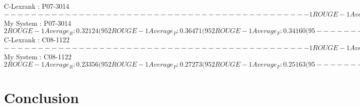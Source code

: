 \documentclass[hyp]{socreport}
\begin{document}
C-Lexrank : P07-3014
$
---------------------------------------------
1 ROUGE-1 Average_R: 0.26598 (95%
1 ROUGE-1 Average_P: 0.25882 (95%
1 ROUGE-1 Average_F: 0.26235 (95%
---------------------------------------------
1 ROUGE-2 Average_R: 0.05401 (95%
1 ROUGE-2 Average_P: 0.05254 (95%
1 ROUGE-2 Average_F: 0.05326 (95%
---------------------------------------------
1 ROUGE-L Average_R: 0.23143 (95%
1 ROUGE-L Average_P: 0.22521 (95%
1 ROUGE-L Average_F: 0.22828 (95%
---------------------------------------------
$
My System : P07-3014
$
2 ROUGE-1 Average_R: 0.32124 (95%
2 ROUGE-1 Average_P: 0.36471 (95%
2 ROUGE-1 Average_F: 0.34160 (95%
---------------------------------------------
2 ROUGE-2 Average_R: 0.08711 (95%
2 ROUGE-2 Average_P: 0.09901 (95%
2 ROUGE-2 Average_F: 0.09268 (95%
---------------------------------------------
2 ROUGE-L Average_R: 0.28670 (95%
2 ROUGE-L Average_P: 0.32549 (95%
2 ROUGE-L Average_F: 0.30487 (95%
pitodogo@POP-Ubuntu:~/SciDoc/src/RELEASE-1.5.5
$
C-Lexrank : C08-1122
$
---------------------------------------------
1 ROUGE-1 Average_R: 0.27163 (95%
1 ROUGE-1 Average_P: 0.25323 (95%
1 ROUGE-1 Average_F: 0.26211 (95%
---------------------------------------------
1 ROUGE-2 Average_R: 0.01745 (95%
1 ROUGE-2 Average_P: 0.01626 (95%
1 ROUGE-2 Average_F: 0.01683 (95%
---------------------------------------------
1 ROUGE-L Average_R: 0.24567 (95%
1 ROUGE-L Average_P: 0.22903 (95%
1 ROUGE-L Average_F: 0.23706 (95%
---------------------------------------------
$
My System : C08-1122
$
2 ROUGE-1 Average_R: 0.23356 (95%
2 ROUGE-1 Average_P: 0.27273 (95%
2 ROUGE-1 Average_F: 0.25163 (95%
---------------------------------------------
2 ROUGE-2 Average_R: 0.03665 (95%
2 ROUGE-2 Average_P: 0.04286 (95%
2 ROUGE-2 Average_F: 0.03951 (95%
---------------------------------------------
2 ROUGE-L Average_R: 0.20588 (95%
2 ROUGE-L Average_P: 0.24040 (95%
2 ROUGE-L Average_F: 0.22180 (95%
$


\section{Conclusion}



\end{document}
